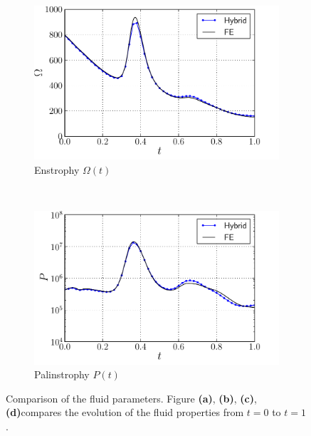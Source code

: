 \begin{figure}[!p]
     \begin{subfigure}[b]{0.49\textwidth}
             \includegraphics[width=\textwidth]{./figures/hybrid/cbColl/hybrid_doubleMonopole_parameter_Omega.pdf}
             \caption{Enstrophy $\Omega(t)$}
             \label{fig:hybrid_dipole_Enstrophy_comparison}
	 \end{subfigure}
     ~
	 \begin{subfigure}[b]{0.48\textwidth}
	 		\includegraphics[width=\textwidth]{./figures/hybrid/cbColl/hybrid_doubleMonopole_parameter_P.pdf}
             \caption{Palinstrophy $P(t)$}
			\label{fig:hybrid_dipole_Palinstrophy_comparison}
	 \end{subfigure}     
     
     \caption{Comparison of the fluid parameters. Figure \textbf{(a)}, \textbf{(b)}, \textbf{(c)}, \textbf{(d)}compares the evolution of the fluid properties from $t=0$ to $t=1$.} %
     \label{fig:hybrid_dipole_comparison}
	\end{figure}

